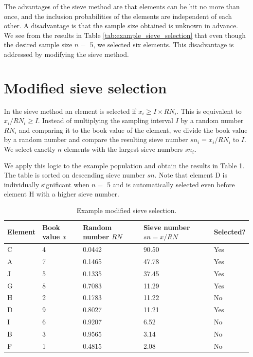 \documentclass[12pt,a4paper]{memoir}
\begin{document}
The advantages of the sieve method are that elements can be hit no more than once, and the inclusion probabilities of the elements are independent of each other. A disadvantage is that the sample size obtained is unknown in advance. We see from the results in Table \ref{tab:example_sieve_selection} that even though the desired sample size $n = $ 5, we selected six elements. This disadvantage is addressed by modifying the sieve method.

\section{Modified sieve selection} In the sieve method an element is selected if $x_i \geq I \times RN_i$. This is equivalent to $x_i / RN_i \geq I$. Instead of multiplying the sampling interval $I$ by a random number $RN_i$ and comparing it to the book value of the element, we divide the book value by a random number and compare the resulting sieve number $sn_i = x_i / RN_i$ to $I$. We select exactly $n$ elements with the largest sieve numbers $sn_i$. 

We apply this logic to the example population and obtain the results in Table \ref{tab:example_modified_sieve_selection}. The table is sorted on descending sieve number $sn$. Note that element D is individually significant when $n = $ 5 and is automatically selected even before element H with a higher sieve number.

\begin{table}[htbp]
\begin{tabularx}{\textwidth}{lXXXX}
\toprule
Element & Book value $x$ & Random number $RN$ & Sieve number $sn = x / RN$ & Selected? \\
\midrule
C & 4 & 0.0442 & 90.50 & Yes \\
A & 7 & 0.1465 & 47.78 & Yes \\
J & 5 & 0.1335 & 37.45 & Yes \\
G & 8 & 0.7083 & 11.29 & Yes \\
H & 2 & 0.1783 & 11.22 & No \\
D & 9 & 0.8027 & 11.21 & Yes \\
I & 6 & 0.9207 & 6.52 & No \\
B & 3 & 0.9565 & 3.14 & No \\
F & 1 & 0.4815 & 2.08 & No \\
\bottomrule
\end{tabularx}
\caption{Example modified sieve selection.}
\label{tab:example_modified_sieve_selection}
\end{table}
\end{document}
